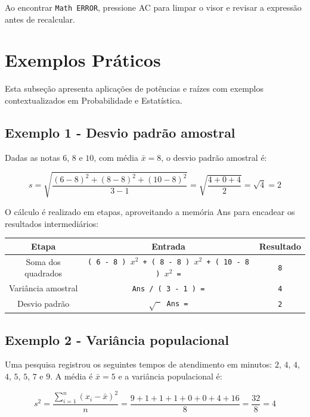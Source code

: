 Ao encontrar \texttt{Math ERROR}, pressione AC para limpar o visor e revisar a expressão antes de recalcular.

\section{Exemplos Práticos}

Esta subseção apresenta aplicações de potências e raízes com exemplos contextualizados em Probabilidade e Estatística.

\subsection*{Exemplo 1 - Desvio padrão amostral}

Dadas as notas $6$, $8$ e $10$, com média $\bar{x} = 8$, o desvio padrão amostral é:

\[
    s = \sqrt{\frac{(6-8)^2 + (8-8)^2 + (10-8)^2}{3-1}} = \sqrt{\frac{4 + 0 + 4}{2}} = \sqrt{4} = 2
\]

O cálculo é realizado em etapas, aproveitando a memória Ans para encadear os resultados intermediários:

\begin{center}
\begin{tabular}{|c|c|c|}
    \hline
    \textbf{Etapa} & \textbf{Entrada} & \textbf{Resultado} \\
    \hline
    Soma dos quadrados & \texttt{( 6 - 8 ) $x^2$ + ( 8 - 8 ) $x^2$ + ( 10 - 8 ) $x^2$ =} & \texttt{8} \\
    Variância amostral & \texttt{Ans / ( 3 - 1 ) =} & \texttt{4} \\
    Desvio padrão & \texttt{$\sqrt{\phantom{x}}$ Ans =} & \texttt{2} \\
    \hline
\end{tabular}
\end{center}

\subsection*{Exemplo 2 - Variância populacional}

Uma pesquisa registrou os seguintes tempos de atendimento em minutos: $2$, $4$, $4$, $4$, $5$, $5$, $7$ e $9$. A média é $\bar{x} = 5$ e a variância populacional é:

\[
    s^2 = \frac{\sum_{i=1}^{n}(x_i - \bar{x})^2}{n} = \frac{9 + 1 + 1 + 1 + 0 + 0 + 4 + 16}{8} = \frac{32}{8} = 4
\]

